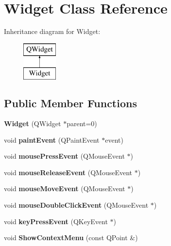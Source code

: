 \hypertarget{classWidget}{}\section{Widget Class Reference}
\label{classWidget}
Inheritance diagram for Widget\+:\begin{figure}[H]
\begin{center}
\leavevmode
\includegraphics[height=2.000000cm]{classWidget}
\end{center}
\end{figure}
\subsection*{Public Member Functions}
\begin{DoxyCompactItemize}
\item 
\mbox{\label{classWidget_a29531c7f141e461322981b3b579d4590}} 
{\bfseries Widget} (Q\+Widget $\ast$parent=0)
\item 
\mbox{\label{classWidget_af755e8891f462562c88c37735345a798}} 
void {\bfseries paint\+Event} (Q\+Paint\+Event $\ast$event)
\item 
\mbox{\label{classWidget_a1957e1c36c79f040037f4c29f2d3962d}} 
void {\bfseries mouse\+Press\+Event} (Q\+Mouse\+Event $\ast$)
\item 
\mbox{\label{classWidget_a3d9a2d8d04d59810bb619e8b1b597ba3}} 
void {\bfseries mouse\+Release\+Event} (Q\+Mouse\+Event $\ast$)
\item 
\mbox{\label{classWidget_ae581766297a4d8d581ff5c24fb18707c}} 
void {\bfseries mouse\+Move\+Event} (Q\+Mouse\+Event $\ast$)
\item 
\mbox{\label{classWidget_a625e5d7a5774d12c1a57fcbeb0a965ed}} 
void {\bfseries mouse\+Double\+Click\+Event} (Q\+Mouse\+Event $\ast$)
\item 
\mbox{\label{classWidget_a3b087438cb505af656cb9f885681ae24}} 
void {\bfseries key\+Press\+Event} (Q\+Key\+Event $\ast$)
\item 
\mbox{\label{classWidget_a2fcd3c4453784d68e102bbee84ed8e46}} 
void {\bfseries Show\+Context\+Menu} (const Q\+Point \&)
\end{DoxyCompactItemize}
